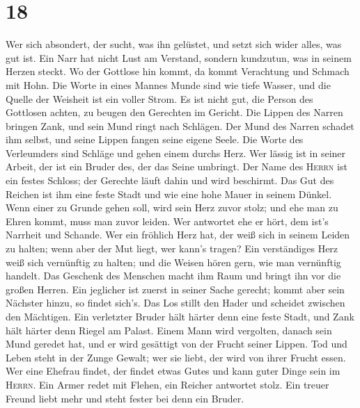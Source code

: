 \hypertarget{section-17}{%
\section{18}\label{section-17}}

 Wer sich absondert, der sucht, was ihn gelüstet, und
setzt sich wider alles, was gut ist.  Ein Narr hat nicht
Lust am Verstand, sondern kundzutun, was in seinem Herzen steckt.
 Wo der Gottlose hin kommt, da kommt Verachtung und
Schmach mit Hohn.  Die Worte in eines Mannes Munde sind
wie tiefe Wasser, und die Quelle der Weisheit ist ein voller Strom.
 Es ist nicht gut, die Person des Gottlosen achten, zu
beugen den Gerechten im Gericht.  Die Lippen des Narren
bringen Zank, und sein Mund ringt nach Schlägen.  Der Mund
des Narren schadet ihm selbst, und seine Lippen fangen seine eigene
Seele.  Die Worte des Verleumders sind Schläge und gehen
einem durchs Herz.  Wer lässig ist in seiner Arbeit, der
ist ein Bruder des, der das Seine umbringt.  Der Name des
\textsc{Herrn} ist ein festes Schloss; der Gerechte läuft dahin und wird
beschirmt.  Das Gut des Reichen ist ihm eine feste Stadt
und wie eine hohe Mauer in seinem Dünkel.  Wenn einer zu
Grunde gehen soll, wird sein Herz zuvor stolz; und ehe man zu Ehren
kommt, muss man zuvor leiden.  Wer antwortet ehe er hört,
dem ist's Narrheit und Schande.  Wer ein fröhlich Herz
hat, der weiß sich in seinem Leiden zu halten; wenn aber der Mut liegt,
wer kann's tragen?  Ein verständiges Herz weiß sich
vernünftig zu halten; und die Weisen hören gern, wie man vernünftig
handelt.  Das Geschenk des Menschen macht ihm Raum und
bringt ihn vor die großen Herren.  Ein jeglicher ist
zuerst in seiner Sache gerecht; kommt aber sein Nächster hinzu, so
findet sich's.  Das Los stillt den Hader und scheidet
zwischen den Mächtigen.  Ein verletzter Bruder hält
härter denn eine feste Stadt, und Zank hält härter denn Riegel am
Palast.  Einem Mann wird vergolten, danach sein Mund
geredet hat, und er wird gesättigt von der Frucht seiner Lippen.
 Tod und Leben steht in der Zunge Gewalt; wer sie liebt,
der wird von ihrer Frucht essen.  Wer eine Ehefrau
findet, der findet etwas Gutes und kann guter Dinge sein im
\textsc{Herrn}.  Ein Armer redet mit Flehen, ein Reicher
antwortet stolz.  Ein treuer Freund liebt mehr und steht
fester bei denn ein Bruder.

